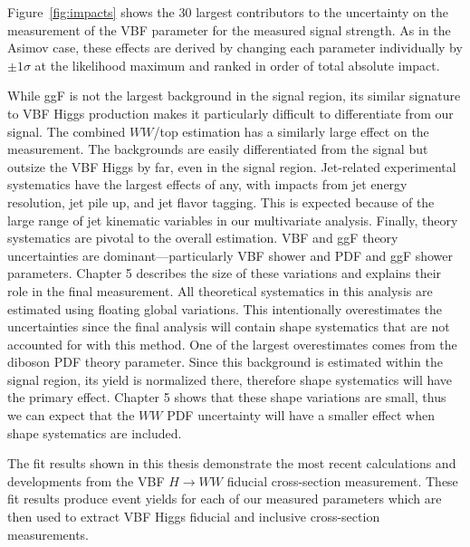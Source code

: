 Figure~\ref{fig:impacts} shows the 30 largest contributors to the uncertainty on the measurement of the VBF parameter for the measured signal strength. As in the Asimov case, these effects are derived by changing each parameter individually by $\pm 1\sigma$ at the likelihood maximum and ranked in order of total absolute impact.

While ggF is not the largest background in the signal region, its similar signature to VBF Higgs production makes it particularly difficult to differentiate from our signal. The combined $WW$/top estimation has a similarly large effect on the measurement. The backgrounds are easily differentiated from the signal but outsize the VBF Higgs by far, even in the signal region. Jet-related experimental systematics have the largest effects of any, with impacts from jet energy resolution, jet pile up, and jet flavor tagging. This is expected because of the large range of jet kinematic variables in our multivariate analysis. Finally, theory systematics are pivotal to the overall estimation. VBF and ggF theory uncertainties are dominant---particularly VBF shower and PDF and ggF shower parameters. Chapter 5 describes the size of these variations and explains their role in the final measurement. All theoretical systematics in this analysis are estimated using floating global variations. This intentionally overestimates the uncertainties since the final analysis will contain shape systematics that are not accounted for with this method. One of the largest overestimates comes from the diboson PDF theory parameter. Since this background is estimated within the signal region, its yield is normalized there, therefore shape systematics will have the primary effect. Chapter 5 shows that these shape variations are small, thus we can expect that the $WW$ PDF uncertainty will have a smaller effect when shape systematics are included. 

The fit results shown in this thesis demonstrate the most recent calculations and developments from the VBF $H\rightarrow WW$ fiducial cross-section measurement. These fit results produce event yields for each of our measured parameters which are then used to extract VBF Higgs fiducial and inclusive cross-section measurements.

